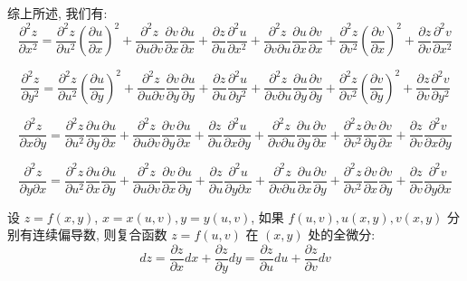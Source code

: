 \begin{definition}[链式法则]
	综上所述, 我们有:
	$$\dfrac{\partial^2 z}{\partial x^2}= \dfrac{\partial ^2z}{\partial u^{2}}(\dfrac{\partial u}{\partial x})^{2}+\dfrac{\partial^{2} z}{\partial u\partial v}\frac{\partial v}{\partial x}\frac{\partial u}{\partial x}+\dfrac{\partial z}{\partial u}\frac{\partial ^2u}{\partial x^2}+
	\dfrac{\partial ^2z}{\partial v\partial u}\dfrac{\partial u}{\partial x}\dfrac{\partial v}{\partial x}+\dfrac{\partial^{2} z}{\partial v^{2}}(\frac{\partial v}{\partial x})^{2}+\dfrac{\partial z}{\partial v}\dfrac{\partial^{2} v}{\partial x^{2}}$$

	$$\dfrac{\partial^2 z}{\partial y^2}= \dfrac{\partial ^2z}{\partial u^{2}}(\dfrac{\partial u}{\partial y})^{2}+\dfrac{\partial^{2} z}{\partial u\partial v}\frac{\partial v}{\partial y}\frac{\partial u}{\partial y}+\dfrac{\partial z}{\partial u}\frac{\partial ^2u}{\partial y^2}+
	\dfrac{\partial ^2z}{\partial v\partial u}\dfrac{\partial u}{\partial y}\dfrac{\partial v}{\partial y}+\dfrac{\partial^{2} z}{\partial v^{2}}(\frac{\partial v}{\partial y})^{2}+\dfrac{\partial z}{\partial v}\dfrac{\partial^{2} v}{\partial y^{2}}$$
	
	$$\dfrac{\partial^2 z}{\partial x\partial y}= \dfrac{\partial ^2z}{\partial u^{2}}\dfrac{\partial u}{\partial y}\dfrac{\partial u}{\partial x}+\dfrac{\partial^{2} z}{\partial u\partial v}\frac{\partial v}{\partial y}\frac{\partial u}{\partial x}+\dfrac{\partial z}{\partial u}\frac{\partial ^2u}{\partial x\partial y}+
	\dfrac{\partial ^2z}{\partial v\partial u}\dfrac{\partial u}{\partial y}\dfrac{\partial v}{\partial x}+\dfrac{\partial^{2} z}{\partial v^{2}}\frac{\partial v}{\partial y}\frac{\partial v}{\partial x}+\dfrac{\partial z}{\partial v}\dfrac{\partial^{2} v}{\partial x\partial y}$$

	$$\dfrac{\partial^2 z}{\partial y\partial x}= \dfrac{\partial ^2z}{\partial u^{2}}\dfrac{\partial u}{\partial x}\dfrac{\partial u}{\partial y}+\dfrac{\partial^{2} z}{\partial u\partial v}\frac{\partial v}{\partial x}\frac{\partial u}{\partial y}+\dfrac{\partial z}{\partial u}\frac{\partial ^2u}{\partial y\partial x}+
	\dfrac{\partial ^2z}{\partial v\partial u}\dfrac{\partial u}{\partial x}\dfrac{\partial v}{\partial y}+\dfrac{\partial^{2} z}{\partial v^{2}}\frac{\partial v}{\partial x}\frac{\partial v}{\partial y}+\dfrac{\partial z}{\partial v}\dfrac{\partial^{2} v}{\partial y\partial x}$$
\end{definition}
\begin{definition}[全微分形式不变性]
	设 $z=f(x,y)$, $x=x(u,v),y=y(u,v)$, 如果 $f(u,v),u(x,y),v(x,y)$ 分别有连续偏导数, 则复合函数 $z=f(u,v)$ 在 $(x,y)$ 处的全微分:
	$$dz=\dfrac{\partial z}{\partial x}dx+\dfrac{\partial z}{\partial y}dy=\dfrac{\partial z}{\partial u}du+\dfrac{\partial z}{\partial v}dv$$
\end{definition}
